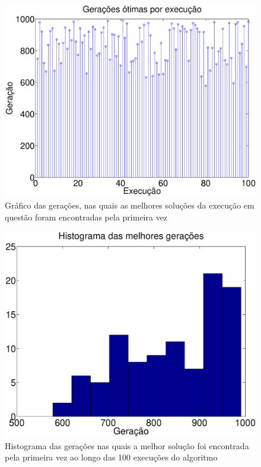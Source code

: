 \documentclass{report}
\begin{document}
\begin{figure}[H]
	\centering
	\includegraphics[width = \textwidth]{Q01_geracao_otima}
	\caption{Gráfico das gerações, nas quais as melhores soluções da execução em questão foram encontradas pela primeira vez}
	\label{geracao_otima_q01}
\end{figure}
	
\begin{figure}[H]
	\centering
	\includegraphics[width = \textwidth]{Q01_hist_geracao_otima}
	\caption{Histograma das gerações nas quais a melhor solução foi encontrada pela primeira vez ao longo das 100 execuções do algoritmo}
	\label{hist_geracao_otima_q01}
\end{figure}
\end{document}
